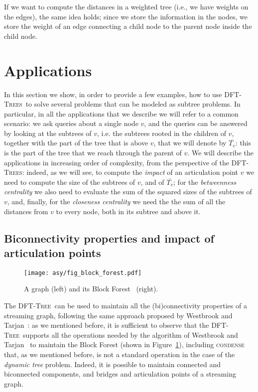 \documentclass[a4paper,USenglish]{lipics}
\newcommand{\dft}{\textsc{DFT-Tree}}
\newcommand{\dfts}{\textsc{DFT-Trees}}
\begin{document}
If we want to compute the distances in a weighted tree (i.e., we have weights on the edges), the same idea holds; since we store the information in the nodes, we store the weight of an edge connecting a child node to the parent node inside the child node. 

\section{Applications}
\label{sec:applications}
In this section we show, in order to provide a few examples, how to use \dfts\ to solve several problems that can be modeled as subtree problems. In particular, in all the applications that we describe we will refer to a common scenario: we ask queries about a single node $v$, and the queries can be answered by looking at the subtrees of $v$, i.e. the subtrees rooted in the children of $v$, together with the part of the tree that is above $v$, that we will denote by $\overline{T_v}$: this is the part of the tree that we reach through the parent of $v$. We will describe the applications in increasing order of complexity, from the perspective of the \dfts: indeed, as we will see, to compute the \emph{impact} of an articulation point $v$ we need to compute the size of the subtrees of $v$, and of $\overline{T_v}$; for the \emph{betweenness centrality} we also need to evaluate the sum of the squared sizes of the subtrees of $v$, and, finally, for the \emph{closeness centrality} we need the the sum of all the distances from $v$ to every node, both in its subtree and above it. 


\subsection{Biconnectivity properties and impact of articulation points}

\begin{figure}[t]
	\centering {}\hfill 	\texttt{[image: asy/fig\_block\_forest.pdf]}
			\caption{A graph (left) and its Block Forest~\cite{WT92} (right).\label{fig:BF}}
\end{figure}

The \dft\ can be used to maintain all the (bi)connectivity properties of a streaming graph, following the same approach proposed by Westbrook and Tarjan~\cite{WT92}: as we mentioned before, it is sufficient to observe that the \dft\ supports all the operations needed by the algorithm of Westbrook and Tarjan~ to maintain the Block Forest (shown in Figure~\ref{fig:BF}), including \textsc{condense} that, as we mentioned before,  is not a standard operation in the case of the \emph{dynamic tree} problem. Indeed, it is possible to maintain connected and biconnected components, and bridges and articulation points of a streaming graph. 
\end{document}
